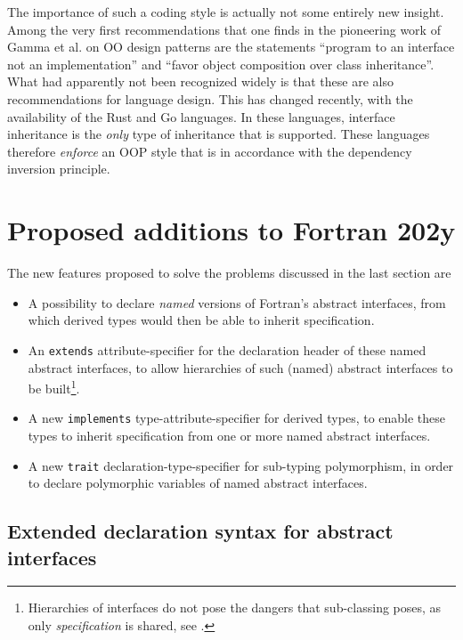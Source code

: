 \documentclass[11pt,oneside]{article}
\begin{document}
The importance of such a coding style is actually not some entirely
new insight. Among the very first recommendations that one finds in
the pioneering work of Gamma et al. \cite{Gamma_et_al_94} on OO design
patterns are the statements ``program to an interface not an
implementation'' and ``favor object composition over class
inheritance''. What had apparently not been recognized widely is that
these are also recommendations for language design. This has changed
recently, with the availability of the Rust and Go languages. In these
languages, interface inheritance is the \emph{only} type of inheritance
that is supported. These languages therefore \emph{enforce} an OOP
style that is in accordance with the dependency inversion principle.


\section{Proposed additions to Fortran 202y}
\label{sect:propositions}

The new features proposed to solve the problems discussed in the last
section are

\begin{itemize}
\item
  A possibility to declare \emph{named} versions of Fortran's abstract
  interfaces, from which derived types would then be able to inherit
  specification.
\item
  An \texttt{extends} attribute-specifier for the declaration header of
  these named abstract interfaces, to allow hierarchies of such (named)
  abstract interfaces to be built\footnote{Hierarchies of interfaces
    do not pose the dangers that sub-classing poses, as only
    \emph{specification} is shared, see \cite{Weck_Szyperski}.}.
\item
  A new \texttt{implements} type-attribute-specifier for derived types, to
  enable these types to inherit specification from one or more named
  abstract interfaces.
\item
  A new \texttt{trait} declaration-type-specifier for sub-typing
  polymorphism, in order to declare polymorphic variables of named
  abstract interfaces.

\end{itemize}

\subsection{Extended declaration syntax for abstract interfaces}
\label{sect:declare}
\end{document}
